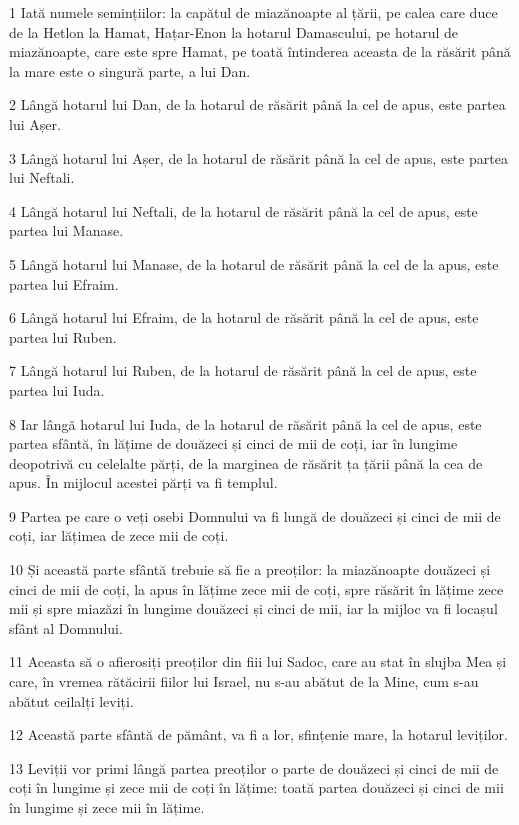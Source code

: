 \par 1 Iată numele semințiilor: la capătul de miazănoapte al țării, pe calea care duce de la Hetlon la Hamat, Hațar-Enon la hotarul Damascului, pe hotarul de miazănoapte, care este spre Hamat, pe toată întinderea aceasta de la răsărit până la mare este o singură parte, a lui Dan.
\par 2 Lângă hotarul lui Dan, de la hotarul de răsărit până la cel de apus, este partea lui Așer.
\par 3 Lângă hotarul lui Așer, de la hotarul de răsărit până la cel de apus, este partea lui Neftali.
\par 4 Lângă hotarul lui Neftali, de la hotarul de răsărit până la cel de apus, este partea lui Manase.
\par 5 Lângă hotarul lui Manase, de la hotarul de răsărit până la cel de la apus, este partea lui Efraim.
\par 6 Lângă hotarul lui Efraim, de la hotarul de răsărit până la cel de apus, este partea lui Ruben.
\par 7 Lângă hotarul lui Ruben, de la hotarul de răsărit până la cel de apus, este partea lui Iuda.
\par 8 Iar lângă hotarul lui Iuda, de la hotarul de răsărit până la cel de apus, este partea sfântă, în lățime de douăzeci și cinci de mii de coți, iar în lungime deopotrivă cu celelalte părți, de la marginea de răsărit ța țării până la cea de apus. În mijlocul acestei părți va fi templul.
\par 9 Partea pe care o veți osebi Domnului va fi lungă de douăzeci și cinci de mii de coți, iar lățimea de zece mii de coți.
\par 10 Și această parte sfântă trebuie să fie a preoților: la miazănoapte douăzeci și cinci de mii de coți, la apus în lățime zece mii de coți, spre răsărit în lățime zece mii și spre miazăzi în lungime douăzeci și cinci de mii, iar la mijloc va fi locașul sfânt al Domnului.
\par 11 Aceasta să o afierosiți preoților din fiii lui Sadoc, care au stat în slujba Mea și care, în vremea rătăcirii fiilor lui Israel, nu s-au abătut de la Mine, cum s-au abătut ceilalți leviți.
\par 12 Această parte sfântă de pământ, va fi a lor, sfințenie mare, la hotarul leviților.
\par 13 Leviții vor primi lângă partea preoților o parte de douăzeci și cinci de mii de coți în lungime și zece mii de coți în lățime: toată partea douăzeci și cinci de mii în lungime și zece mii în lățime.
